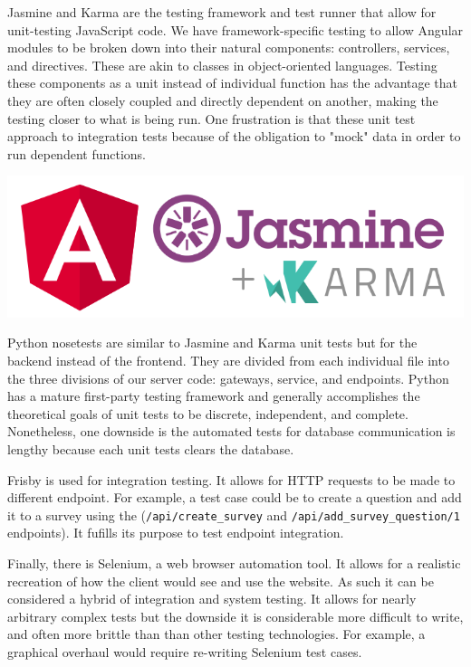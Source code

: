 \documentclass[12pt]{report}
\begin{document}
\par\noindent
Jasmine and Karma are the testing framework and test runner that allow for unit-testing JavaScript code. We have framework-specific testing to allow Angular modules to be broken down into their natural components: controllers, services, and directives. These are akin to classes in object-oriented languages. Testing these components as a unit instead of individual function has the advantage that they are often closely coupled and directly dependent on another, making the testing closer to what is being run. One frustration is that these unit test approach to integration tests because of the obligation to "mock" data in order to run dependent functions.

\begin{center}
\includegraphics[scale=0.4]{karma}
\end{center}

\par\noindent
Python nosetests are similar to Jasmine and Karma unit tests but for the backend instead of the frontend. They are divided from each individual file into the three divisions of our server code: gateways, service, and endpoints. Python has a mature first-party testing framework and generally accomplishes the theoretical goals of unit tests to be discrete, independent, and complete. Nonetheless, one downside is the automated tests for database communication is lengthy because each unit tests clears the database.

\par\noindent
Frisby is used for integration testing. It allows for HTTP requests to be made to different endpoint. For example, a test case could be to create a question and add it to a survey using the (\texttt{/api/create\_survey} and \texttt{/api/add\_survey\_question/1} endpoints). It fufills its purpose to test endpoint integration.

\par\noindent
Finally, there is Selenium, a web browser automation tool. It allows for a realistic recreation of how the client would see and use the website. As such it can be considered a hybrid of integration and system testing. It allows for nearly arbitrary complex tests but the downside it is considerable more difficult to write, and often more brittle than than other testing technologies. For example, a graphical overhaul would require re-writing Selenium test cases.
\end{document}
